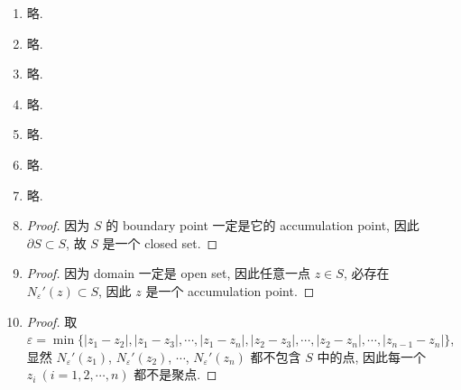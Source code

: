 \documentclass[a4paper, 11pt]{article}
\begin{document}
\begin{enumerate}
    \item %
        略.
    \item %
        略.
    \item %
        略.
    \item %
        略.
    \item %
        略.
    \item %
        略.
    \item %
        略.
    \item %
        \begin{proof}
            因为 $S$ 的 boundary point 一定是它的 accumulation point, 因此 $\partial{S} \subset S$, 故 $S$ 是一个 closed set.
        \end{proof}
    \item %
        \begin{proof}
            因为 domain 一定是 open set, 因此任意一点 $z \in S$, 必存在 $N_\varepsilon'(z) \subset S$, 因此 $z$ 是一个 accumulation point.
        \end{proof}
    \item %
        \begin{proof}
            取 $\varepsilon = \min\{|z_1 - z_2|, |z_1 - z_3|, \cdots, |z_1 - z_n|, |z_2 - z_3|, \cdots, |z_2 - z_n|, \cdots, |z_{n-1} - z_n|\}$,
            显然 $N_\varepsilon'(z_1)$, $N_\varepsilon'(z_2)$, $\cdots$, $N_\varepsilon'(z_n)$ 都不包含 $S$ 中的点, 因此每一个 $z_i\ (i = 1, 2, \cdots, n)$ 都不是聚点.
        \end{proof}
\end{enumerate}
\end{document}
